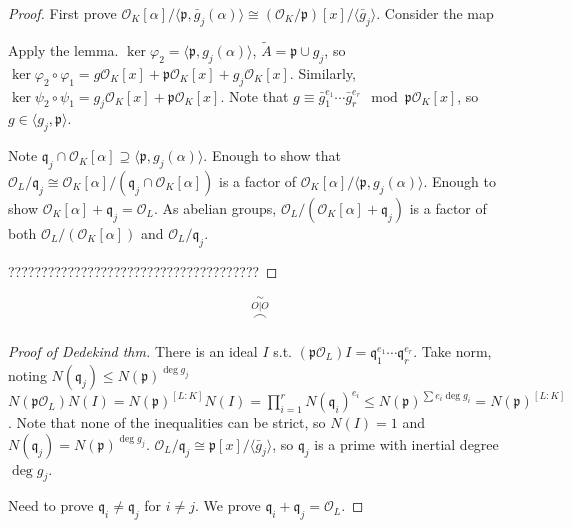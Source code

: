 \documentclass{article}
\theoremstyle{definition}
\theoremstyle{remark}
\theoremstyle{plain}
\begin{document}
\begin{proof}
    First prove $\mathcal O_K[\alpha]/\langle\mathfrak p,\bar g_j(\alpha)\rangle\cong(\mathcal O_K/\mathfrak p)[x]/\langle\bar g_j\rangle$. Consider the map
    \begin{center}
    \end{center}
    Apply the lemma. $\ker\varphi_2=\langle\mathfrak p,g_j(\alpha)\rangle$, $\tilde A=\mathfrak p\cup g_j$, so $\ker\varphi_2\circ\varphi_1=g\mathcal O_K[x]+\mathfrak p\mathcal O_K[x]+g_j\mathcal O_K[x]$.
    Similarly, $\ker\psi_2\circ\psi_1=g_j\mathcal O_K[x]+\mathfrak p\mathcal O_K[x]$. Note that $g\equiv \bar g_1^{e_1}\cdots \bar g_r^{e_r}\mod\mathfrak p\mathcal O_K[x]$, so $g\in\langle g_j,\mathfrak p\rangle$.

    Note $\mathfrak q_j\cap \mathcal O_K[\alpha]\supseteq \langle\mathfrak p,g_j(\alpha)\rangle$. Enough to show that $\mathcal O_L/\mathfrak q_j\cong \mathcal O_K[\alpha]/(\mathfrak q_j\cap \mathcal O_K[\alpha])$ is a factor of $\mathcal O_K[\alpha]/\langle\mathfrak p,g_j(\alpha)\rangle$. Enough to show $\mathcal O_K[\alpha]+\mathfrak q_j=\mathcal O_L$. As abelian groups, $\mathcal O_L/(\mathcal O_K[\alpha]+\mathfrak q_j)$ is a factor of both $\mathcal O_L/(\mathcal O_K[\alpha])$ and $\mathcal O_L/\mathfrak q_j$.

    ??????????????????????????????????????
\end{proof}
\[\overset{\sim}{\overset{O\vert O}{\frown}}\tag{Owen's Signature}\]
\begin{proof}[Proof of Dedekind thm]
    There is an ideal $I$ s.t. $(\mathfrak p\mathcal O_L)I=\mathfrak q_1^{e_1}\cdots\mathfrak q_r^{e_r}$. Take norm, noting $N(\mathfrak q_j)\le N(\mathfrak p)^{\deg g_j}$
    $N(\mathfrak p\mathcal O_L)N(I)=N(\mathfrak p)^{[L:K]}N(I)=\prod_{i=1}^rN(\mathfrak q_i)^{e_i}\le N(\mathfrak p)^{\sum e_i\deg g_i}=N(\mathfrak p)^{[L:K]}$. Note that none of the inequalities can be strict, so $N(I)=1$ and $N(\mathfrak q_j)=N(\mathfrak p)^{\deg g_j}$. $\mathcal O_L/\mathfrak q_j\cong \mathfrak p[x]/\langle \bar g_j\rangle$, so $\mathfrak q_j$ is a prime with inertial degree $\deg g_j$.

    Need to prove $\mathfrak q_i\neq \mathfrak q_j$ for $i\neq j$. We prove $\mathfrak q_i+\mathfrak q_j=\mathcal O_L$.
\end{proof}
\newcommand{\cl}{\operatorname{Cl}}
\end{document}
